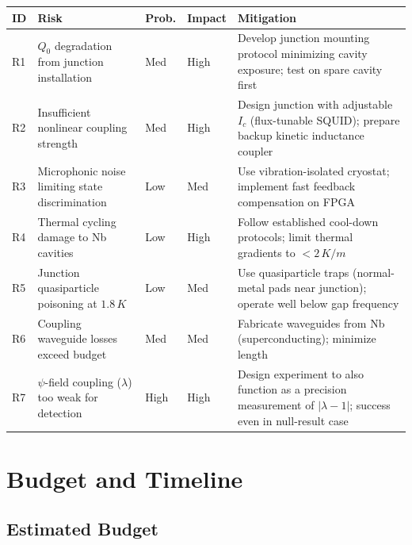 \documentclass[12pt,a4paper]{article}
\begin{document}
\begin{longtable}{p{0.5cm}p{3.5cm}p{1cm}p{1cm}p{5cm}}
\toprule
\textbf{ID} & \textbf{Risk} & \textbf{Prob.} & \textbf{Impact} & \textbf{Mitigation} \\
\midrule
\endhead
R1 & $Q_0$ degradation from junction installation & Med & High & Develop junction mounting protocol minimizing cavity exposure; test on spare cavity first \\
R2 & Insufficient nonlinear coupling strength & Med & High & Design junction with adjustable $I_c$ (flux-tunable SQUID); prepare backup kinetic inductance coupler \\
R3 & Microphonic noise limiting state discrimination & Low & Med & Use vibration-isolated cryostat; implement fast feedback compensation on FPGA \\
R4 & Thermal cycling damage to Nb cavities & Low & High & Follow established cool-down protocols; limit thermal gradients to $< 2\,\si{K/m}$ \\
R5 & Junction quasiparticle poisoning at $1.8\,\si{K}$ & Low & Med & Use quasiparticle traps (normal-metal pads near junction); operate well below gap frequency \\
R6 & Coupling waveguide losses exceed budget & Med & Med & Fabricate waveguides from Nb (superconducting); minimize length \\
R7 & $\psi$-field coupling ($\lambda$) too weak for detection & High & High & Design experiment to also function as a precision measurement of $|\lambda - 1|$; success even in null-result case \\
\bottomrule
\end{longtable}

\section{Budget and Timeline}

\subsection{Estimated Budget}
\end{document}
